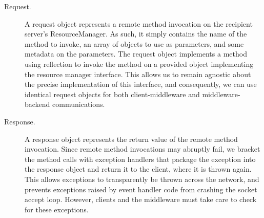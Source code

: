 \documentclass[letterpaper,11pt]{article}
\begin{document}
\begin{description}
    \item[Request.] A request object represents a remote method invocation on
        the recipient server's ResourceManager. As such, it simply contains the
        name of the method to invoke, an array of objects to use as parameters,
        and some metadata on the parameters. The request object implements a
        method using reflection to invoke the method on a provided object
        implementing the resource manager interface. This allows us to remain
        agnostic about the precise implementation of this interface, and
        consequently, we can use identical request objects for both
        client-middleware and middleware-backend communications.

    \item[Response.] A response object represents the return value of the
        remote method invocation. Since remote method invocations may abruptly
        fail, we bracket the method calls with exception handlers that
        package the exception into the response object and return it to the
        client, where it is thrown again. This allows exceptions to
        transparently be thrown across the network, and prevents exceptions
        raised by event handler code from crashing the socket accept loop.
        However, clients and the middleware must take care to check for these
        exceptions.
\end{description}
\end{document}
